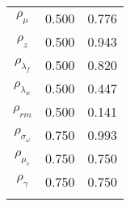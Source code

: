 \documentclass[12pt]{article}
\begin{document}
\begin{table}[h]
\begin{tabular}{ccc}
$\rho_{\mu}$ &    0.500 &    0.776 \\
$\rho_z$ &    0.500 &    0.943 \\
$\rho_{\lambda_f}$ &    0.500 &    0.820 \\
$\rho_{\lambda_w}$ &    0.500 &    0.447 \\
$\rho_{rm}$ &    0.500 &    0.141 \\
$\rho_{\sigma_\omega}$ &    0.750 &    0.993 \\
$\rho_{\mu_e}$ &    0.750 &    0.750 \\
$\rho_{\gamma}$ &    0.750 &    0.750 \\
\\ \hline
\end{tabular}
\end{table}
\end{document}
